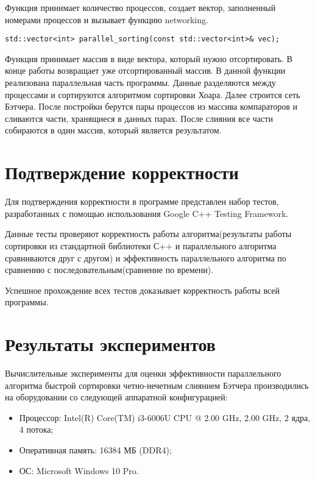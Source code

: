 \documentclass{report}
\begin{document}
\par Функция принимает количество процессов, создает вектор, заполненный номерами процессов и вызывает функцию networking.
\begin{lstlisting}
std::vector<int> parallel_sorting(const std::vector<int>& vec);
\end{lstlisting}
\par Функция принимает массив в виде вектора, который нужно отсортировать. В конце работы возвращает уже отсортированный массив. В данной функции реализована параллельная часть программы. Данные разделяются между процессами и сортируются алгоритмом сортировки Хоара. Далее строится сеть Бэтчера. После постройки берутся пары процессов из массива компараторов и сливаются части, хранящиеся в данных парах. После слияния все части собираются в один массив, который является результатом.  

\newpage

\section*{Подтверждение корректности}
Для подтверждения корректности в программе представлен набор тестов, разработанных с помощью использования Google C++ Testing Framework.
\par Данные тесты проверяют корректность работы алгоритма(результаты работы сортировки из стандартной библиотеки С++  и параллельного алгоритма сравниваются друг с другом) и эффективность параллельного алгоритма по сравнению с последовательным(сравнение по времени).
\par Успешное прохождение всех тестов доказывает корректность работы всей программы.
\newpage

\section*{Результаты экспериментов}
Вычислительные эксперименты для оценки эффективности параллельного алгоритма быстрой сортировки четно-нечетным слиянием Бэтчера производились на оборудовании со следующей аппаратной конфигурацией:

\begin{itemize}
\item Процессор: Intel(R) Core(TM) i3-6006U CPU @ 2.00 GHz, 2.00 GHz, 2 ядра, 4 потока;
\item Оперативная память: 16384 МБ (DDR4);
\item ОС: Microsoft Windows 10 Pro. 
\end{itemize}
\end{document}
